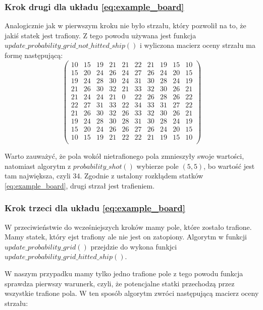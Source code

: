 \documentclass[magisterska]{pracadypl}
\begin{document}
\subsubsection{Krok drugi dla układu \eqref{eq:example_board}}
Analogicznie jak w pierwszym kroku nie było strzału, który pozwolił na to, że jakiś statek jest trafiony. Z tego powodu używana jest funkcja $update\_probability\_grid\_not\_hitted\_ship()$ i wyliczona macierz oceny strzału ma formę następującą:
$$
\begin{pmatrix}
10 & 15 & 19 & 21 & 21 & 22 & 21 & 19 & 15 & 10 \\
15 & 20 & 24 & 26 & 24 & 27 & 26 & 24 & 20 & 15 \\
19 & 24 & 28 & 30 & 24 & 31 & 30 & 28 & 24 & 19 \\
21 & 26 & 30 & 32 & 21 & 33 & 32 & 30 & 26 & 21 \\
21 & 24 & 24 & 21 & 0 & 22 & 26 & 28 & 26 & 22 \\
22 & 27 & 31 & 33 & 22 & 34 & 33 & 31 & 27 & 22 \\
21 & 26 & 30 & 32 & 26 & 33 & 32 & 30 & 26 & 21 \\
19 & 24 & 28 & 30 & 28 & 31 & 30 & 28 & 24 & 19 \\
15 & 20 & 24 & 26 & 26 & 27 & 26 & 24 & 20 & 15 \\
10 & 15 & 19 & 21 & 22 & 22 & 21 & 19 & 15 & 10 \\
\end{pmatrix}
$$

Warto zauważyć, że pola wokół nietrafionego pola zmnieszyły swoje wartości, natomiast algorytm z $probability\_shot()$ wybierze pole $(5,5)$, bo wartość jest tam największa, czyli 34. Zgodnie z ustalony rozkłądem statków \eqref{eq:example_board},  drugi strzał jest trafieniem.

\subsubsection{Krok trzeci dla układu \eqref{eq:example_board}}

W przeciwieństwie do wcześniejszych kroków mamy pole, które zostało trafione. Mamy statek, który ejst trafiony ale nie jest on zatopiony. Algorytm w funkcji $update\_probability\_grid()$ przejdzie do wykona funkjci $update\_probability\_grid\_hitted\_ship()$.

W naszym przypadku mamy tylko jedno trafione pole z tego powodu funkcja sprawdza pierwszy warunerk, czyli, że potencjalne statki przechodzą przez wszystkie trafione pola. W ten sposób algorytm zwróci następującą macierz oceny strzału:
\end{document}
